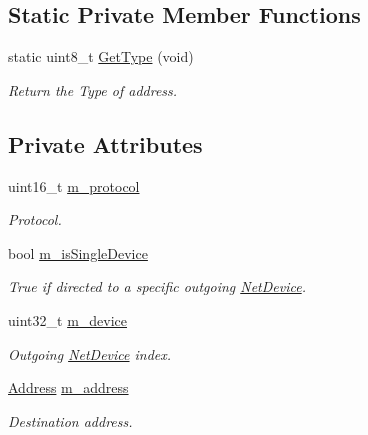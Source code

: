 \subsection*{Static Private Member Functions}
\begin{DoxyCompactItemize}
\item 
static uint8\+\_\+t \hyperlink{classns3_1_1PacketSocketAddress_a703aa2fb4a6a54902db175138723d6c9}{Get\+Type} (void)
\begin{DoxyCompactList}\small\item\em Return the Type of address. \end{DoxyCompactList}\end{DoxyCompactItemize}
\subsection*{Private Attributes}
\begin{DoxyCompactItemize}
\item 
uint16\+\_\+t \hyperlink{classns3_1_1PacketSocketAddress_adfd7dd5b6fb703aa70e379b9d6ec247c}{m\+\_\+protocol}
\begin{DoxyCompactList}\small\item\em Protocol. \end{DoxyCompactList}\item 
bool \hyperlink{classns3_1_1PacketSocketAddress_a96c62833941b0d645a43dfe4f4668a3a}{m\+\_\+is\+Single\+Device}
\begin{DoxyCompactList}\small\item\em True if directed to a specific outgoing \hyperlink{classns3_1_1NetDevice}{Net\+Device}. \end{DoxyCompactList}\item 
uint32\+\_\+t \hyperlink{classns3_1_1PacketSocketAddress_a79577415c47dc03939872d20dc3a1c35}{m\+\_\+device}
\begin{DoxyCompactList}\small\item\em Outgoing \hyperlink{classns3_1_1NetDevice}{Net\+Device} index. \end{DoxyCompactList}\item 
\hyperlink{classns3_1_1Address}{Address} \hyperlink{classns3_1_1PacketSocketAddress_a5df3880f8024ed73a1fac83ab454d7b4}{m\+\_\+address}
\begin{DoxyCompactList}\small\item\em Destination address. \end{DoxyCompactList}\end{DoxyCompactItemize}


